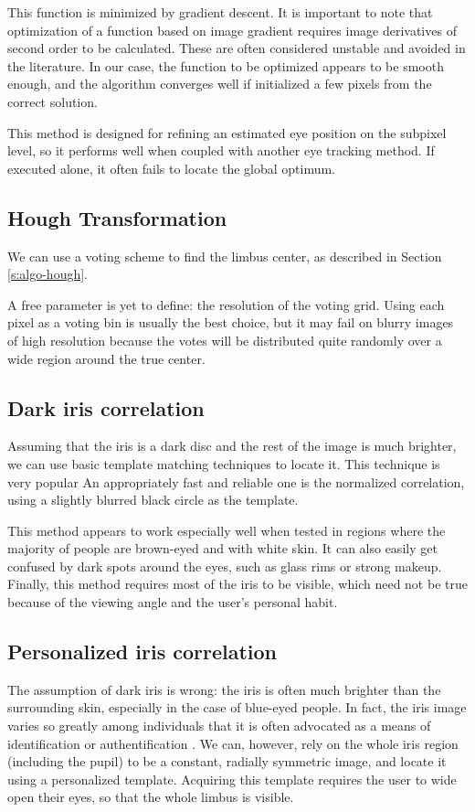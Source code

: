 This function is minimized by gradient descent.
It is important to note that optimization of a function based on image gradient requires image derivatives of second order to be calculated.
These are often considered unstable and avoided in the literature.
In our case, the function to be optimized appears to be smooth enough, and the algorithm converges well if initialized a few pixels from the correct solution.

This method is designed for refining an estimated eye position on the subpixel level, so it performs well when coupled with another eye tracking method.
If executed alone, it often fails to locate the global optimum.

\subsection{Hough Transformation}
We can use a voting scheme to find the limbus center, as described in Section \ref{s:algo-hough}.

A free parameter is yet to define: the resolution of the voting grid.
Using each pixel as a voting bin is usually the best choice, but it may fail on blurry images of high resolution because the votes will be distributed quite randomly over a wide region around the true center.

\subsection{Dark iris correlation}

Assuming that the iris is a dark disc and the rest of the image is much brighter, we can use basic template matching techniques to locate it.
This technique is very popular \cite{zhu12,george16}
An appropriately fast and reliable one is the normalized correlation, using a slightly blurred black circle as the template.


This method appears to work especially well when tested in regions where the majority of people are brown-eyed and with white skin.
It can also easily get confused by dark spots around the eyes, such as glass rims or strong makeup.
Finally, this method requires most of the iris to be visible, which need not be true because of the viewing angle and the user's personal habit.

\subsection{Personalized iris correlation}
The assumption of dark iris is wrong: the iris is often much brighter than the surrounding skin, especially in the case of blue-eyed people.
In fact, the iris image varies so greatly among individuals that it is often advocated as a means of identification or authentification \cite{bowyer16}.
We can, however, rely on the whole iris region (including the pupil) to be a constant, radially symmetric image, and locate it using a personalized template.
Acquiring this template requires the user to wide open their eyes, so that the whole limbus is visible.

